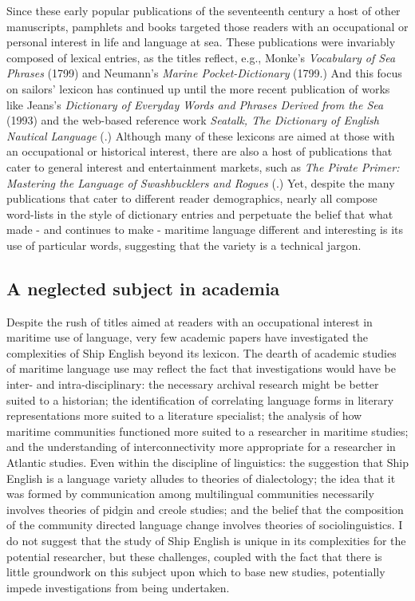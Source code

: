 Since these early popular publications of the seventeenth century a host of other manuscripts, pamphlets and books targeted those readers with an occupational or personal interest in life and language at sea. These publications were invariably composed of lexical entries, as the titles reflect, e.g., Monke’s \textit{Vocabulary of Sea Phrases} (1799) and Neumann’s \textit{Marine Pocket-Dictionary} (1799.) And this focus on sailors’ lexicon has continued up until the more recent publication of works like Jeans’s \textit{Dictionary of Everyday Words and Phrases Derived from the S}\textit{ea} (1993) and the web-based reference work \textit{Seatalk, The Dictionary of English Nautical Language} (\citealt{MacKenzie2005}.) Although many of these lexicons are aimed at those with an occupational or historical interest, there are also a host of publications that cater to general interest and entertainment markets, such as \textit{The Pirate Primer: Mastering the Language of Swashbucklers and Rogues} (\citealt{Choundas2007}.) Yet, despite the many publications that cater to different reader demographics, nearly all compose word-lists in the style of dictionary entries and perpetuate the belief that what made - and continues to make - maritime language different and interesting is its use of particular words, suggesting that the variety is a technical jargon. 



\subsection{{A} {neglected} {subject} {in} {academia}}%



Despite the rush of titles aimed at readers with an occupational interest in maritime use of language, very few academic papers have investigated the complexities of Ship English beyond its lexicon.  The dearth of academic studies of maritime language use may reflect the fact that investigations would have be inter- and intra-disciplinary: the necessary archival research might be better suited to a historian; the identification of correlating language forms in literary representations more suited to a literature specialist; the analysis of how maritime communities functioned more suited to a researcher in maritime studies; and the understanding of interconnectivity more appropriate for a researcher in Atlantic studies. Even within the discipline of linguistics: the suggestion that Ship English is a language variety alludes to theories of dialectology; the idea that it was formed by communication among multilingual communities necessarily involves theories of pidgin and creole studies; and the belief that the composition of the community directed language change involves theories of sociolinguistics. I do not suggest that the study of Ship English is unique in its complexities for the potential researcher, but these challenges, coupled with the fact that there is little groundwork on this subject upon which to base new studies, potentially impede investigations from being undertaken. 



